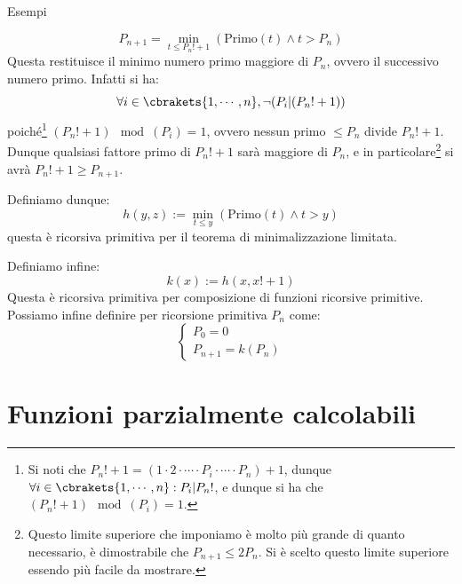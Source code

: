 \begin{generalbox}[colframe=azure-gradient-3!90!black]{Esempi}
\begin{enumerate}
\begin{itemize}
\begin{equation}
        P_{n+1}=\min_{t\leq P_{n}!+1}(\text{Primo}(t) \land t>P_n)
      \end{equation}
      Questa restituisce il minimo numero primo maggiore di \(P_n\), ovvero il successivo numero primo. Infatti si ha:
      \begin{equation}
        \forall i\in\cbrakets{1,\cdots,n}, \neg(P_i|(P_n!+1))
      \end{equation}
      poiché\footnote{Si noti che \(P_n!+1=(1\cdot 2 \cdot \cdots \cdot P_i \cdot \cdots \cdot P_n)+1\), dunque \(\forall i\in\cbrakets{1,\cdots,n}: P_i|P_n!\), e dunque si ha che \((P_n!+1)\mod (P_i)=1\).}   \((P_n!+1)\mod (P_i)=1\), ovvero nessun primo \(\leq P_n\) divide \(P_n!+1\). Dunque qualsiasi fattore primo di \(P_n!+1\) sarà maggiore di \(P_n\), e in particolare\footnote{Questo limite superiore che imponiamo è molto più grande di quanto necessario, è dimostrabile che \(P_{n+1}\leq2P_n\). Si è scelto questo limite superiore essendo più facile da mostrare.}   si avrà \(P_n!+1\geq P_{n+1}\). %

      Definiamo dunque:
      \begin{equation}
        h(y,z) := \min_{t\leq y}(\text{Primo}(t) \land t>y)
      \end{equation}
      questa è ricorsiva primitiva per il teorema di minimalizzazione limitata.

      Definiamo infine:
      \begin{equation}
        k(x):= h(x, x!+1)
      \end{equation}
      Questa è ricorsiva primitiva per composizione di funzioni ricorsive primitive. Possiamo infine definire per ricorsione primitiva \(P_n\) come:
      \begin{equation}
         \begin{cases}
            P_0=0\\
            P_{n+1}=k(P_n)
          \end{cases}
      \end{equation}
    \end{itemize}
  \end{enumerate}
\end{generalbox}

\newpage

\section{Funzioni parzialmente calcolabili}

